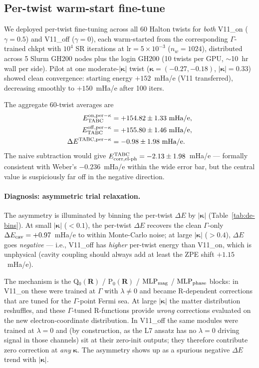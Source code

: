 \documentclass[reprint,amsmath,amssymb,aps,prb,floatfix,nofootinbib]{revtex4-2}
\newcommand{\Ehp}{E_{\mathrm{corr},\mathrm{el}\text{-}\mathrm{ph}}}
\begin{document}
\subsection{Per-twist warm-start fine-tune}\label{sec:results-perk}
We deployed per-twist fine-tuning across all 60 Halton twists for
\emph{both} V11\_on ($\gamma = 0.5$) and V11\_off ($\gamma = 0$),
each warm-started from the corresponding $\Gamma$-trained chkpt with
$10^4$ SR iterations at $\mathrm{lr} = 5\times10^{-3}$
($n_w = 1024$), distributed across 5 Slurm GH200 nodes plus the
login GH200 (10 twists per GPU, $\sim$10~hr wall per side).  Pilot at
one moderate-$|\bm\kappa|$ twist
($\bm\kappa = (-0.27, -0.18)$, $|\bm\kappa| = 0.33$) showed clean
convergence: starting energy $+152$~mHa/e (V11 transferred),
decreasing smoothly to $+150$~mHa/e after 100 iters.

The aggregate 60-twist averages are
\begin{align}
E_{\rm TABC}^{\rm on, per-\kappa}  &= +154.82 \pm 1.33 \text{ mHa/e}, \\
E_{\rm TABC}^{\rm off, per-\kappa} &= +155.80 \pm 1.46 \text{ mHa/e}, \\
\Delta E^{\rm TABC, per-\kappa}   &= -0.98 \pm 1.98 \text{ mHa/e}.
\end{align}
The naive subtraction would give
$\Ehp^{\rm TABC} = -2.13 \pm 1.98$~mHa/e --- formally consistent with
Weber's $-0.236$~mHa/e within the wide error bar, but the central
value is suspiciously far off in the negative direction.

\paragraph{Diagnosis: asymmetric trial relaxation.}
The asymmetry is illuminated by binning the per-twist $\Delta E$ by
$|\bm\kappa|$ (Table~\ref{tab:de-bins}).  At small $|\bm\kappa|$
($<0.1$), the per-twist $\Delta E$ recovers the clean $\Gamma$-only
$\Delta E_{\rm cav} = +0.97$~mHa/e to within Monte-Carlo noise; at
large $|\bm\kappa|$ ($>0.4$), $\Delta E$ goes \emph{negative} ---
i.e., V11\_off has \emph{higher} per-twist energy than V11\_on,
which is unphysical (cavity coupling should always add at least the
ZPE shift $+1.15$~mHa/e).

The mechanism is the Q$_0(\mathbf{R})$ / P$_0(\mathbf{R})$ /
$\mathrm{MLP}_{\rm mag}$ / $\mathrm{MLP}_{\rm phase}$ blocks: in
V11\_on these were trained at $\Gamma$ with $\lambda \neq 0$ and
became R-dependent corrections that are tuned for the $\Gamma$-point
Fermi sea.  At large $|\bm\kappa|$ the matter distribution
reshuffles, and these $\Gamma$-tuned R-functions provide
\emph{wrong} corrections evaluated on the new electron-coordinate
distribution.  In V11\_off the same modules were trained at
$\lambda = 0$ and (by construction, as the L7 ansatz has no
$\lambda = 0$ driving signal in those channels) sit at their
zero-init outputs; they therefore contribute zero correction at
\emph{any} $\bm\kappa$.  The asymmetry shows up as a spurious
negative $\Delta E$ trend with $|\bm\kappa|$.
\end{document}

